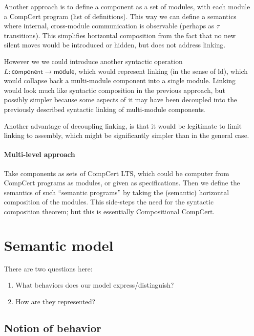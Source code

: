 \documentclass[11pt]{article}
\begin{document}
Another approach is to define a component as a set of modules,
with each module a CompCert program (list of definitions).
This way we can define a semantics where
internal, cross-module communication is observable
(perhaps as $\tau$ transitions).
This simplifies horizontal composition
from the fact that no new silent moves
would be introduced or hidden,
but does not address linking.

However we we could introduce another syntactic operation
$L : \mathsf{component} \rightarrow \mathsf{module}$,
which would represent linking (in the sense of \textsf{ld}),
which would collapse back a multi-module component
into a single module.
Linking would look much like syntactic composition in the previous approach,
but possibly simpler because some aspects of it may have been decoupled
into the previously described
syntactic linking of multi-module components.

Another advantage of decoupling linking,
is that it would be legitimate
to limit linking to assembly,
which might be significantly simpler
than in the general case.


\paragraph{Multi-level approach} %

Take components as sets of CompCert LTS,
which could be computer from CompCert programs as modules,
or given as specifications.
Then we define the semantics of such
``semantic programs'' by taking the (semantic)
horizontal composition of the modules.
This side-steps the need for the syntactic composition theorem;
but this is essentially Compositional CompCert.



\section{Semantic model} %

There are two questions here:
\begin{enumerate}
\item What behaviors does our model express/distinguish?
\item How are they represented?
\end{enumerate}

\subsection{Notion of behavior} %
\end{document}
